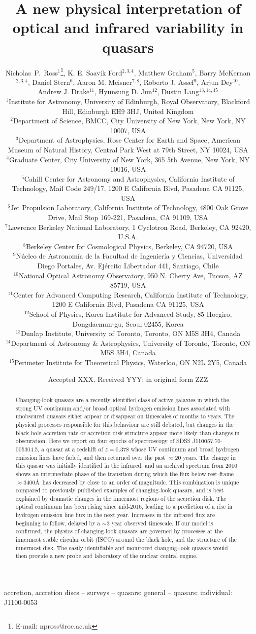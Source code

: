 \documentclass[a4paper,fleqn,usenatbib]{mnras}
\title[Variability in the quasar J1100-0053]{A new physical interpretation of optical and infrared variability in quasars}
\author[N.P. Ross et al.]
{Nicholas~P.~Ross$^{1}$\thanks{E-mail: npross@roe.ac.uk},    
K. E. Saavik Ford$^{2,3,4}$,  Matthew Graham$^{5}$,  Barry McKernan$^{2,3,4}$,  
\newauthor Daniel Stern$^{6}$, Aaron M. Meisner$^{7,8}$, Roberto J. Assef$^{9}$, 
Arjun Dey$^{10}$, Andrew J. Drake$^{11}$, 
\newauthor Hyunsung D. Jun$^{12}$, Dustin Lang$^{13,14,15}$
\\
$^{1}$Institute for Astronomy, University of Edinburgh, Royal Observatory, Blackford Hill, Edinburgh EH9 3HJ, United Kingdom \\
$^{2}$Department of Science, BMCC, City University of New York, New York, NY 10007, USA \\
$^{3}$Department of Astrophysics, Rose Center for Earth and Space, American Museum of Natural History, Central Park West at 79th Street, NY 10024, USA \\
$^{4}$Graduate Center, City University of New York, 365 5th Avenue, New York, NY 10016, USA\\
$^{5}$Cahill Center for Astronomy and Astrophysics, California Institute of Technology, Mail Code 249/17, 1200 E California Blvd, Pasadena CA 91125, USA\\
$^{6}$Jet Propulsion Laboratory, California Institute of Technology, 4800 Oak Grove Drive, Mail Stop 169-221, Pasadena, CA 91109, USA \\
$^{7}$Lawrence Berkeley National Laboratory, 1 Cyclotron Road, Berkeley, CA 92420, U.S.A. \\
$^{8}$Berkeley Center for Cosmological Physics, Berkeley, CA 94720, USA\\
$^{9}$N\'ucleo de Astronom\'ia de la Facultad de Ingenier\'ia y Ciencias, Universidad Diego Portales, Av. Ej\'ercito Libertador 441, Santiago, Chile \\
$^{10}$National Optical Astronomy Observatory, 950 N. Cherry Ave, Tucson, AZ 85719, USA \\
$^{11}$Center for Advanced Computing Research, California Institute of Technology, 1200 E California Blvd, Pasadena CA 91125, USA \\
$^{12}$School of Physics, Korea Institute for Advanced Study, 85 Hoegiro, Dongdaemun-gu, Seoul 02455, Korea\\
$^{13}$Dunlap Institute, University of Toronto, Toronto, ON M5S 3H4, Canada \\
$^{14}$Department of Astronomy \& Astrophysics, University of Toronto, Toronto, ON M5S 3H4, Canada \\
$^{15}$Perimeter Institute for Theoretical Physics, Waterloo, ON N2L 2Y5, Canada\\
}
\date{Accepted XXX. Received YYY; in original form ZZZ}
\begin{document}
\label{firstpage}
\pagerange{\pageref{firstpage}--\pageref{lastpage}}
\maketitle


\begin{abstract}
Changing-look quasars are a recently identified class of active galaxies in which the strong UV continuum and/or broad optical hydrogen emission lines associated with unobscured quasars either appear or disappear on timescales of months to years.  The physical processes responsible for this behaviour are still debated, but changes in the black hole accretion rate or accretion disk structure appear more likely than changes in obscuration. Here we report on four epochs of spectroscopy of SDSS J110057.70-005304.5, a quasar at a redshift of $z=0.378$ whose UV continuum and broad hydrogen emission lines have faded, and then returned over the past $\approx$20 years. The change in this quasar was initially identified in the infrared, and an archival spectrum from 2010 shows an intermediate phase of the transition during which the flux below rest-frame $\approx$3400\AA\ has decreased by close to an order of magnitude. This combination is unique compared to previously published examples of changing-look quasars, and is best explained by dramatic changes in the innermost regions of the accretion disk. The optical continuum has been rising since mid-2016, leading to a prediction of a rise in hydrogen emission line flux in the next year. Increases in the infrared flux are beginning to follow, delayed by a $\sim$3 year observed timescale. If our model is confirmed, the physics of changing-look quasars are governed by processes at the innermost stable circular orbit (ISCO) around the black hole, and the structure of the innermost disk. The easily identifiable and monitored changing-look quasars would then provide a new probe and laboratory of the nuclear central engine.
\end{abstract}

\begin{keywords}
accretion, accretion discs -- surveys -- quasars: general -- quasars: individual: J1100-0053 
\end{keywords}




\end{document}
